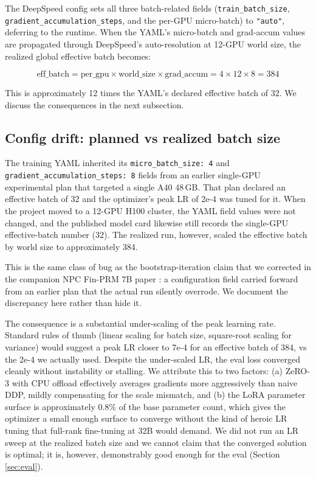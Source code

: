 \documentclass[10pt,letterpaper]{article}
\begin{document}
The DeepSpeed config sets all three batch-related fields (\texttt{train\_batch\_size}, \texttt{gradient\_accumulation\_steps}, and the per-GPU micro-batch) to \texttt{"auto"}, deferring to the runtime. When the YAML's micro-batch and grad-accum values are propagated through DeepSpeed's auto-resolution at 12-GPU world size, the realized global effective batch becomes:

\begin{equation}
\text{eff\_batch} = \text{per\_gpu} \times \text{world\_size} \times \text{grad\_accum} = 4 \times 12 \times 8 = 384
\end{equation}

This is approximately 12 times the YAML's declared effective batch of 32. We discuss the consequences in the next subsection.

\subsection{Config drift: planned vs realized batch size}
\label{sec:drift}

The training YAML inherited its \texttt{micro\_batch\_size: 4} and \texttt{gradient\_accumulation\_steps: 8} fields from an earlier single-GPU experimental plan that targeted a single A40 48\,GB. That plan declared an effective batch of 32 and the optimizer's peak LR of 2e-4 was tuned for it. When the project moved to a 12-GPU H100 cluster, the YAML field values were not changed, and the published model card likewise still records the single-GPU effective-batch number (32). The realized run, however, scaled the effective batch by world size to approximately 384.

This is the same class of bug as the bootstrap-iteration claim that we corrected in the companion NPC Fin-PRM 7B paper \cite{bachu2026cheapprms}: a configuration field carried forward from an earlier plan that the actual run silently overrode. We document the discrepancy here rather than hide it.

The consequence is a substantial under-scaling of the peak learning rate. Standard rules of thumb (linear scaling for batch size, square-root scaling for variance) would suggest a peak LR closer to 7e-4 for an effective batch of 384, vs the 2e-4 we actually used. Despite the under-scaled LR, the eval loss converged cleanly without instability or stalling. We attribute this to two factors: (a) ZeRO-3 with CPU offload effectively averages gradients more aggressively than naive DDP, mildly compensating for the scale mismatch, and (b) the LoRA parameter surface is approximately 0.8\% of the base parameter count, which gives the optimizer a small enough surface to converge without the kind of heroic LR tuning that full-rank fine-tuning at 32B would demand. We did not run an LR sweep at the realized batch size and we cannot claim that the converged solution is optimal; it is, however, demonstrably good enough for the eval (Section \ref{sec:eval}).
\end{document}
